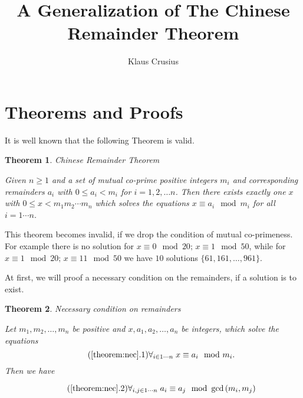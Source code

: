 \documentclass[12pt]{article}
\title{A Generalization of The Chinese Remainder Theorem}
\author{Klaus Crusius}
\newtheorem{theorem}{Theorem}
\def\1ton{1 \cdots n}
\providecommand{\for}[2]{\forall_{#1 \in #2} \;}
\providecommand{\forn}[1]{\for{#1}{\1ton}}
\def\lt{<}
\begin{document}
\maketitle
\newpage
\tableofcontents
\newpage
{}

\noindent \section{Theorems and Proofs}


\indent It is well known that the following Theorem is valid.

\begin{theorem}{Chinese Remainder Theorem}
	\label{theorem:CRT}
	
	Given $n \ge 1$ and a set of mutual co-prime positive integers $m_i$ and corresponding remainders $ a_i $ with $ 0 \le a_i \lt m_i$ for $ i = 1,2,\dotsc n$. Then there exists exactly one $x$ with $ 0 \le x \lt m_1 m_2 \dotsm m_n$ which solves the equations
	$ x \equiv a_i  \mod  m_i$ for all $ i = \1ton$. \cite[ch.~4.3.2, p.~286]{Knuth2}

\end{theorem}

This theorem becomes invalid, if we drop the condition of mutual co-primeness. For example there is no solution for  $x \equiv 0 \mod 20 \text{; }x \equiv 1 \mod 50$, while for $x \equiv 1 \mod 20 \text{; } x \equiv 11 \mod 50$ we have $10$ solutions $\{61, 161, \dotsc, 961\}$.

At first, we will proof a necessary condition on the remainders, if a solution is to exist.

\begin{theorem}{Necessary condition on remainders}
	\label{theorem:nec}
	
	Let $m_1, m_2, \dotsc, m_n$ be positive and $x, a_1, a_2, \dotsc, a_n$ be integers, which solve the equations
	\begin{equation}
	\label{eq:xam}\tag{\ref{theorem:nec}.1}
	 \forn{i} x \equiv a_i \mod m_i.
	 \end{equation}
	Then we have
	
	\begin{equation}
	\label{eq:amij}\tag{\ref{theorem:nec}.2}
	 \forn{i, j} a_i \equiv a_j \mod \gcd\left(m_i, m_j\right)
	 \end{equation}
\end{theorem}
\end{document}
